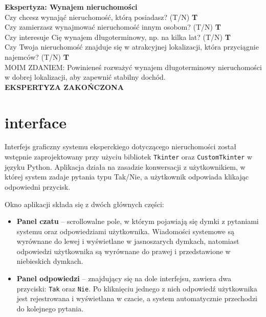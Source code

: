 \noindent \textbf{Ekspertyza: Wynajem nieruchomości}\\
\noindent Czy chcesz wynająć nieruchomość, którą posiadasz? (T/N) \textbf{T} \\
\noindent Czy zamierzasz wynajmować nieruchomość innym osobom? (T/N) \textbf{T} \\
\noindent Czy interesuje Cię wynajem długoterminowy, np. na kilka lat? (T/N) \textbf{T} \\
\noindent Czy Twoja nieruchomość znajduje się w atrakcyjnej lokalizacji, która przyciągnie najemców? (T/N) \textbf{T} \\
MOIM ZDANIEM: Powinieneś rozważyć wynajem długoterminowy nieruchomości w dobrej lokalizacji, aby zapewnić stabilny dochód.\\
\textbf{EKSPERTYZA ZAKOŃCZONA}\\

\section{interface}
Interfejs graficzny systemu eksperckiego dotyczącego nieruchomości został wstępnie zaprojektowany przy użyciu bibliotek \texttt{Tkinter} oraz \texttt{CustomTkinter} w języku Python. Aplikacja działa na zasadzie konwersacji z użytkownikiem, w której system zadaje pytania typu Tak/Nie, a użytkownik odpowiada klikając odpowiedni przycisk.

Okno aplikacji składa się z dwóch głównych części:
\begin{itemize}
    \item \textbf{Panel czatu} -- scrollowalne pole, w którym pojawiają się dymki z pytaniami systemu oraz odpowiedziami użytkownika. Wiadomości systemowe są wyrównane do lewej i wyświetlane w jasnoszarych dymkach, natomiast odpowiedzi użytkownika są wyrównane do prawej i przedstawione w niebieskich dymkach.
    \item \textbf{Panel odpowiedzi} -- znajdujący się na dole interfejsu, zawiera dwa przyciski: \texttt{Tak} oraz \texttt{Nie}. Po kliknięciu jednego z nich odpowiedź użytkownika jest rejestrowana i wyświetlana w czacie, a system automatycznie przechodzi do kolejnego pytania.
\end{itemize}

